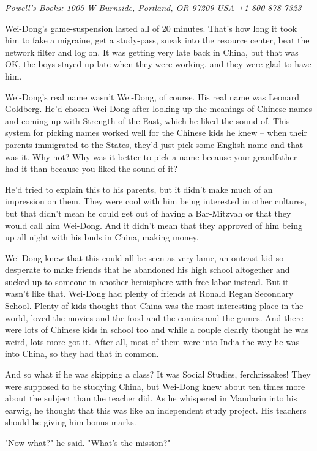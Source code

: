 \emph{\href{http://www.powells.com/cgi-bin/biblio?isbn=9780765322166}{Powell's Books}: 1005 W Burnside, Portland, OR 97209 USA +1 800 878 7323}

Wei-Dong's game-suspension lasted all of 20 minutes. That's how
long it took him to fake a migraine, get a study-pass, sneak into
the resource center, beat the network filter and log on. It was
getting very late back in China, but that was OK, the boys stayed
up late when they were working, and they were glad to have him.

Wei-Dong's real name wasn't Wei-Dong, of course. His real name was
Leonard Goldberg. He'd chosen Wei-Dong after looking up the
meanings of Chinese names and coming up with Strength of the East,
which he liked the sound of. This system for picking names worked
well for the Chinese kids he knew -- when their parents immigrated
to the States, they'd just pick some English name and that was it.
Why not? Why was it better to pick a name because your grandfather
had it than because you liked the sound of it?

He'd tried to explain this to his parents, but it didn't make much
of an impression on them. They were cool with him being interested
in other cultures, but that didn't mean he could get out of having
a Bar-Mitzvah or that they would call him Wei-Dong. And it didn't
mean that they approved of him being up all night with his buds in
China, making money.

Wei-Dong knew that this could all be seen as very lame, an outcast
kid so desperate to make friends that he abandoned his high school
altogether and sucked up to someone in another hemisphere with free
labor instead. But it wasn't like that. Wei-Dong had plenty of
friends at Ronald Regan Secondary School. Plenty of kids thought
that China was the most interesting place in the world, loved the
movies and the food and the comics and the games. And there were
lots of Chinese kids in school too and while a couple clearly
thought he was weird, lots more got it. After all, most of them
were into India the way he was into China, so they had that in
common.

And so what if he was skipping a class? It was Social Studies,
ferchrissakes! They were supposed to be studying China, but
Wei-Dong knew about ten times more about the subject than the
teacher did. As he whispered in Mandarin into his earwig, he
thought that this was like an independent study project. His
teachers should be giving him bonus marks.

"Now what?" he said. "What's the mission?"

